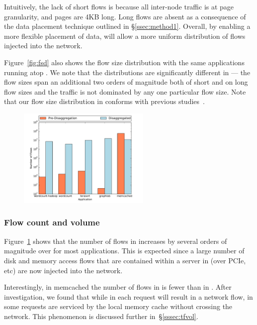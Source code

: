 Intuitively, the lack of short flows is because all inter-node traffic is at page granularity, and pages are 4KB long. Long flows are absent as a consequence of the data placement technique outlined in \S\ref{ssec:method1}. Overall, by enabling a more flexible placement of data, \dis will allow a more uniform distribution of flows injected into the network.

Figure~\ref{fig:fsd} also shows the flow size distribution with the same applications running atop \pdis. We note that the distributions are significantly different in \pdis --- the flow sizes span an additional two orders of magnitude both of short and on long flow sizes and the traffic is not dominated by any one particular flow size. Note that our flow size distribution in \pdis conforms with previous studies~\cite{imc-srikant, imc-theo}.

%
\begin{figure}
  \centering
    \includegraphics[width = 2.5in]{img/graph2_numflows} 
  \caption{\small{}}
  \label{fig:nof}
\end{figure}
%
%
\subsubsection{Flow count and volume}
\label{sssec:fctv}
Figure~\ref{fig:nof} shows that the number of flows in \dis increases by several orders of magnitude over \pdis for most applications. This is expected since a large number of disk and memory access flows that are contained within a server in \pdis (over PCIe, etc) are now injected into the network.

Interestingly, in memcached the number of flows in \ddc is fewer than in \pdis. After investigation, we found that while in \pdis each request will result in a network flow, in \dis some requests are serviced by the local memory cache without crossing the network. This phenomenon is discussed further in~\S\ref{sssec:tfvol}.

